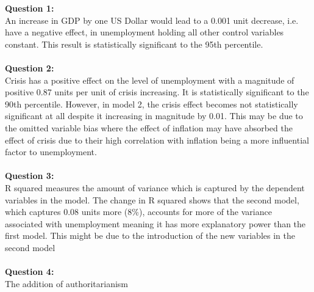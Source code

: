 \documentclass[12pt, letterpaper]{article}
\begin{document}
\textbf{Question 1:}\\
An increase in GDP by one US Dollar would lead to a 0.001 unit decrease, i.e. have a negative effect, in unemployment holding all other control variables constant. This result is statistically significant to the 95th percentile.\\\\
\textbf{Question 2:}\\
Crisis has a positive effect on the level of unemployment with a magnitude of positive 0.87 units per unit of crisis increasing. It is statistically significant to the 90th percentile. However, in model 2, the crisis effect becomes not statistically significant at all despite it increasing in magnitude by 0.01. This may be due to the omitted variable bias where the effect of inflation may have absorbed the effect of crisis due to their high correlation with inflation being a more influential factor to unemployment.\\\\
\textbf{Question 3:}\\
R squared measures the amount of variance which is captured by the dependent variables in the model. The change in R squared shows that the second model, which captures 0.08 units more (8\%), accounts for more of the variance associated with unemployment meaning it has more explanatory power than the first model. This might be due to the introduction of the new variables in the second model \\\\
\textbf{Question 4:}\\
The addition of authoritarianism
\\\\
\newpage
\end{document}
